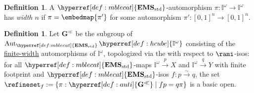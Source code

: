\documentclass[
  sigconf,
  screen, ]{acmart}
\theoremstyle{definition}
\newtheorem{definition}[theorem]{Definition}
\newcommand\Aut{\operatorname{Aut}}
\newcommand\nref[2]{\hyperref[#1]{#2}} \newcommand\checkhigh{{\huge{\color{red}\textbf{TODO: check}}}}
\newcommand\texhcube{{{{\mathbb I}^\omega}}}
\newcommand\hcube{{\nref{def:hcube}{\texhcube}}}
\newcommand\texStdMble{\mathbf{EMS}_{\rm std}}
\newcommand\StdMble{{\nref{def:mblecat}{\texStdMble}}}
\newcommand\texauti{\mathbf{G}^{\ll}}
\newcommand\auti{{\nref{def:auti}{\texauti}}}
\begin{document}
\begin{definition} \label{app:def:autoff}
  A $\StdMble$-automorphism
  $\pi : \hcube\to \hcube$
  has \emph{width $n$}
  if $\pi = \embedmap{\pi'}$
  for some automorphism $\pi' : [0,1]^n\to[0,1]^n$.
\end{definition}

\begin{definition} \label{app:def:auti}
  Let $\auti$ be the subgroup of $\Aut_\StdMble\hcube$
  consisting of the \nref{app:def:autoff}{finite-width}
  automorphisms of $\hcube$,
  topologized via the 
  with respect to $\rami$-isos:
  for all $\StdMble$-maps $\hcube\xrightarrow pX$
  and $\hcube\xrightarrow qY$ with finite footprint
  and $\StdMble$-isos $f : p\stackrel\sim\to q$,
  the set $\refineset_f := \{\pi : \auti \mid fp = q\pi\}$
  is a basic open.
\end{definition}
\end{document}

